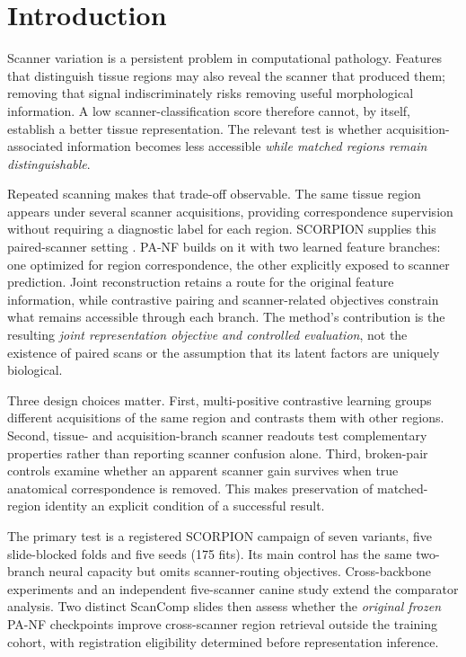\section{Introduction}

Scanner variation is a persistent problem in computational pathology. Features that distinguish tissue regions may also reveal the scanner that produced them; removing that signal indiscriminately risks removing useful morphological information. A low scanner-classification score therefore cannot, by itself, establish a better tissue representation. The relevant test is whether acquisition-associated information becomes less accessible \emph{while matched regions remain distinguishable}.

Repeated scanning makes that trade-off observable. The same tissue region appears under several scanner acquisitions, providing correspondence supervision without requiring a diagnostic label for each region. SCORPION supplies this paired-scanner setting \cite{ryu2023scorpion}. PA-NF builds on it with two learned feature branches: one optimized for region correspondence, the other explicitly exposed to scanner prediction. Joint reconstruction retains a route for the original feature information, while contrastive pairing and scanner-related objectives constrain what remains accessible through each branch. The method's contribution is the resulting \emph{joint representation objective and controlled evaluation}, not the existence of paired scans or the assumption that its latent factors are uniquely biological.

Three design choices matter. First, multi-positive contrastive learning groups different acquisitions of the same region and contrasts them with other regions. Second, tissue- and acquisition-branch scanner readouts test complementary properties rather than reporting scanner confusion alone. Third, broken-pair controls examine whether an apparent scanner gain survives when true anatomical correspondence is removed. This makes preservation of matched-region identity an explicit condition of a successful result.

The primary test is a registered SCORPION campaign of seven variants, five slide-blocked folds and five seeds (175 fits). Its main control has the same two-branch neural capacity but omits scanner-routing objectives. Cross-backbone experiments and an independent five-scanner canine study extend the comparator analysis. Two distinct ScanComp slides then assess whether the \emph{original frozen} PA-NF checkpoints improve cross-scanner region retrieval outside the training cohort, with registration eligibility determined before representation inference.

